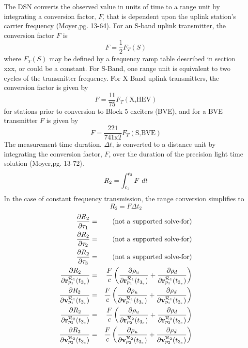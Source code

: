 The DSN converts the observed value in units of time to a range unit by integrating a conversion factor, $F$, that is dependent upon the uplink station's carrier frequency (Moyer\cite{Moyer},pg. 13-64).   For an S-band uplink transmitter, the conversion factor $F$ is
%
\begin{equation}
    F = \frac{1}{2}F_T(S)
\end{equation}
%
where $F_T(S)$ may be defined by a frequency ramp table described in section xxx, or could be a constant.  For S-Band, one range unit is equivalent to two cycles of the transmitter frequency.  For X-Band uplink transmitters, the conversion factor is given by
%
\begin{equation}
    F = \frac{11}{75}F_T(\mbox{X,HEV})
\end{equation}
%
for stations prior to conversion to Block 5 exciters (BVE), and for a BVE transmitter $F$ is given by
%
\begin{equation}
    F = \frac{221}{741 \mbox{x} 2}F_T(\mbox{S,BVE})
\end{equation}
%
The measurement time duration, $\Delta t$, is converted to a distance unit by integrating the conversion factor, $F$, over the duration of the precision light time solution (Moyer\cite{Moyer},pg. 13-72).
%
\begin{equation}
   R_2 =  \int_{t_1}^{t_3} F \hspace{.05 in} dt
\end{equation}
%
In the case of constant frequency transmission, the range conversion simplifies to
%
\begin{equation}
   R_2 =   F \Delta t_2
\end{equation}
%
\begin{eqnarray}
    \frac{\partial R_2}{\partial  \tau_1} & = & \mbox{(not a supported solve-for)}\\
    \frac{\partial R_2}{\partial  \tau_2} & = & \mbox{(not a supported solve-for)}\\
    \frac{\partial R_2}{\partial  \tau_3} & = & \mbox{(not a supported solve-for)}\\
    \frac{\partial R_2}{\partial \mathbf{r}^{\mcR_1}_{p_1}(t_{3_e})} & = & \frac{F}{c}\left(\frac{\partial \rho_{u}}{\partial \mathbf{r}^{\mcR_1}_{p_1}(t_{3_e})} + \frac{\partial \rho_{d}}{\partial \mathbf{r}^{\mcR_1}_{p_1}(t_{3_e})} \right)\\
    \frac{\partial R_2}{\partial \mathbf{v}^{\mcR_1}_{p_1}(t_{3_e})} & = & \frac{F}{c}\left(\frac{\partial \rho_{u}}{\partial \mathbf{v}^{\mcR_1}_{p_1}(t_{3_e})} + \frac{\partial \rho_{d}}{\partial \mathbf{v}^{\mcR_1}_{p_1}(t_{3_e})}\right)\\
    \frac{\partial R_2}{\partial \mathbf{r}^{\mcR_2}_{p_2}(t_{3_e})} & = & \frac{F}{c}\left(\frac{\partial \rho_{u}}{\partial \mathbf{r}^{\mcR_2}_{p_2}(t_{3_e})} + \frac{\partial \rho_{d}}{\partial \mathbf{r}^{\mcR_2}_{p_2}(t_{3_e})}\right)\\
    \frac{\partial R_2}{\partial \mathbf{v}^{\mcR_2}_{p_2}(t_{3_e})} & = & \frac{F}{c}\left(\frac{\partial \rho_{u}}{\partial \mathbf{v}^{\mcR_2}_{p_2}(t_{3_e})} + \frac{\partial \rho_{d}}{\partial \mathbf{v}^{\mcR_2}_{p_2}(t_{3_e})}\right)\\
\end{eqnarray}
